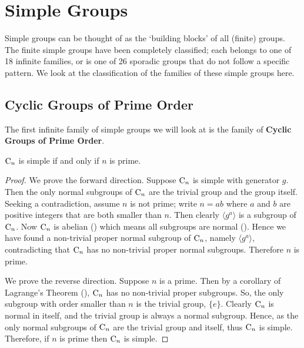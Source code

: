 \chapter{Simple Groups}
Simple groups can be thought of as the `building blocks' of all (finite) groups. The finite simple groups have been completely classified; each belongs to one of 18 infinite families, or is one of 26 sporadic groups that do not follow a specific pattern. We look at the classification of the families of these simple groups here.

\section{Cyclic Groups of Prime Order}
The first infinite family of simple groups we will look at is the family of \textbf{Cyclic Groups of Prime Order}.

\begin{lemma}\label{lemma-cyclic-group-simple-iff-order-is-prime}
    $\mathrm{C}_{n}$ is simple if and only if $n$ is prime.
\end{lemma}
\begin{proof}
    We prove the forward direction. Suppose $\mathrm{C}_{n}$ is simple with generator $g$. Then the only normal subgroups of $\mathrm{C}_{n}$ are the trivial group and the group itself. Seeking a contradiction, assume $n$ is not prime; write $n = ab$ where $a$ and $b$ are positive integers that are both smaller than $n$. Then clearly $\langle g^a\rangle$ is a subgroup of $\mathrm{C}_{n}$. Now $\mathrm{C}_{n}$ is abelian () which means all subgroups are normal (). Hence we have found a non-trivial proper normal subgroup of $\mathrm{C}_{n}$, namely $\langle g^a \rangle$, contradicting that $\mathrm{C}_{n}$ has no non-trivial proper normal subgroups. Therefore $n$ is prime.
    
    We prove the reverse direction. Suppose $n$ is a prime. Then by a corollary of Lagrange's Theorem (), $\mathrm{C}_{n}$ has no non-trivial proper subgroups. So, the only subgroup with order smaller than $n$ is the trivial group, $\{e\}$. Clearly $\mathrm{C}_{n}$ is normal in itself, and the trivial group is always a normal subgroup. Hence, as the only normal subgroups of $\mathrm{C}_{n}$ are the trivial group and itself, thus $\mathrm{C}_{n}$ is simple. Therefore, if $n$ is prime then $\mathrm{C}_{n}$ is simple.
\end{proof}

